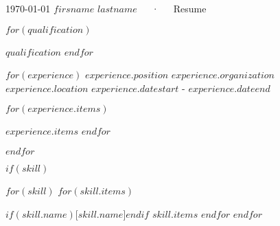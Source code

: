 \documentclass[11pt, a4paper]{awesome-cv}
\begin{document}
\makecvheader[C]

\makecvfooter
  {\today}
  {$firsname$ $lastname$~~~·~~~Resume}
  {\thepage}


\begin{cventries}
\cventry
  {} 
  {} 
  {} 
  {}
  {
    \begin{cvitems} 
      $for(qualification)$
    \item{$qualification$}
      $endfor$
    \end{cvitems}
  }
\end{cventries}

\begin{cventries}
$for(experience)$
  \cventry
    {$experience.position$} %
    {$experience.organization$} %
    {$experience.location$} %
    {$experience.datestart$ - $experience.dateend$} %
    {
      \begin{cvitems} %
        $for(experience.items)$
        \item{$experience.items$}
        $endfor$
      \end{cvitems}
    }

$endfor$
\end{cventries}

$if(skill)$
\begin{cventries}

  
  \cventry
    {} 
    {} 
    {} 
    {}
    {
      \begin{cvitems} 
        $for(skill)$
        $for(skill.items)$
        \item{$if(skill.name)$[$skill.name$]$endif$ $skill.items$}
        $endfor$
        $endfor$
      \end{cvitems}
    }


\end{cventries}
\end{document}
